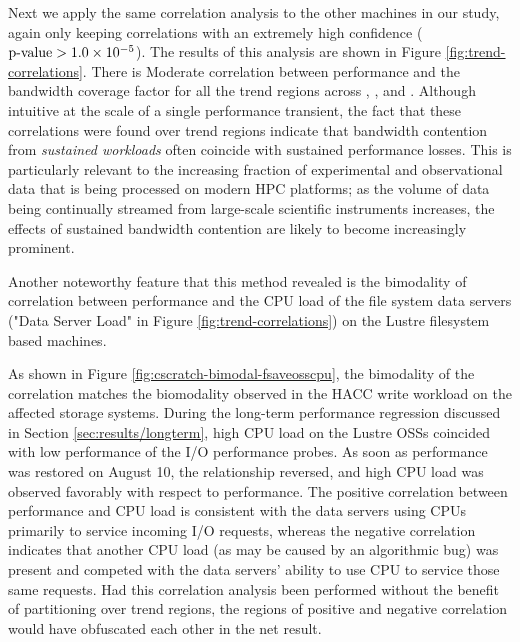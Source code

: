 Next we apply the same correlation analysis to the other machines in our study, again only keeping correlations with an extremely high confidence ($\textup{p-value} > {1.0 \times 10^{-5}}$). 
The results of this analysis are shown in Figure \ref{fig:trend-correlations}. There is Moderate correlation between performance and the bandwidth coverage factor for all the trend regions across \mira, \cori, and \edison.
Although intuitive at the scale of a single performance transient, the fact that these correlations were found over trend regions indicate that bandwidth contention from \emph{sustained workloads} often coincide with sustained performance losses.
This is particularly relevant to the increasing fraction of experimental and observational data that is being processed on modern HPC platforms; as the volume of data being continually streamed from large-scale scientific instruments increases, the effects of sustained bandwidth contention are likely to become increasingly prominent.

Another noteworthy feature that this method revealed is the bimodality of correlation between performance and the CPU load of the file system data servers ("Data Server Load" in Figure \ref{fig:trend-correlations}) on the Lustre filesystem based machines.

As shown in Figure \ref{fig:cscratch-bimodal-fsaveosscpu}, the bimodality of the correlation matches the biomodality observed in the HACC write workload on the affected storage systems.
During the long-term performance regression discussed in Section \ref{sec:results/longterm}, high CPU load on the Lustre OSSs coincided with low performance of the I/O performance probes.
As soon as performance was restored on August 10, the relationship reversed, and high CPU load was observed favorably with respect to performance.
The positive correlation between performance and CPU load is consistent with the data servers using CPUs primarily to service incoming I/O requests, whereas the negative correlation indicates that another CPU load (as may be caused by an algorithmic bug) was present and competed with the data servers' ability to use CPU to service those same requests.
Had this correlation analysis been performed without the benefit of partitioning over trend regions, the regions of positive and negative correlation would have obfuscated each other in the net result. 



